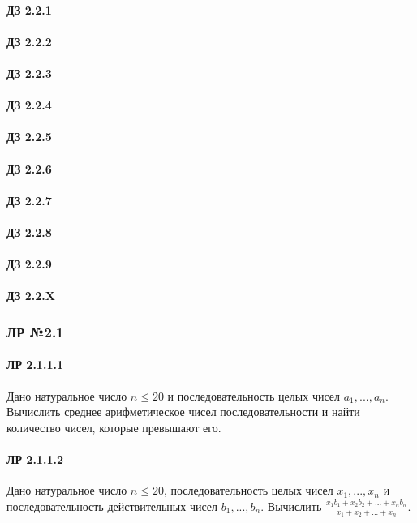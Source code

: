 \documentclass[12pt,a4paper]{report}
\begin{document}
\paragraph*{ДЗ 2.2.1}
\paragraph*{ДЗ 2.2.2}
\paragraph*{ДЗ 2.2.3}
\paragraph*{ДЗ 2.2.4}
\paragraph*{ДЗ 2.2.5}
\paragraph*{ДЗ 2.2.6}
\paragraph*{ДЗ 2.2.7}
\paragraph*{ДЗ 2.2.8}
\paragraph*{ДЗ 2.2.9}
\paragraph*{ДЗ 2.2.X}

\clearpage
\subsubsection*{ЛР №2.1}

\clearpage
\paragraph*{ЛР 2.1.1.1} Дано натуральное число $n \le 20$ и последовательность целых чисел $a_1, ..., a_n$. Вычислить среднее арифметическое чисел последовательности и найти количество чисел, которые превышают его.
\paragraph*{ЛР 2.1.1.2} Дано натуральное число $n \le 20$, последовательность целых чисел $x_1, ..., x_n$ и последовательность действительных чисел $b_1, ..., b_n$. Вычислить $\frac { x_1 b_1 + x_2 b_2 + ... + x_n b_n} { x_1 + x_2 + ... + x_n }$.
\end{document}
